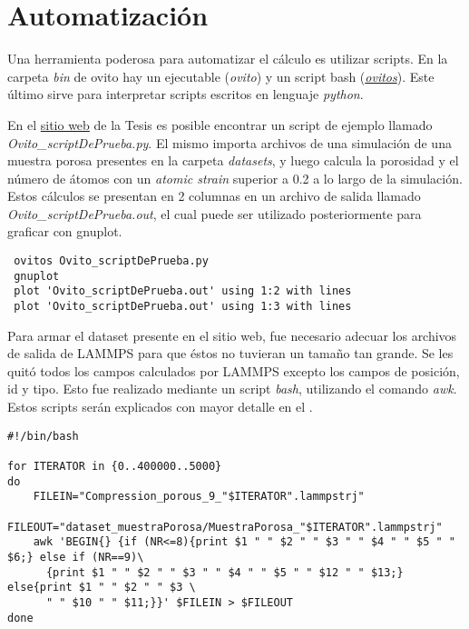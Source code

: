 \section{Automatización}
\label{AB_3}

Una herramienta poderosa para automatizar el cálculo es utilizar scripts. En la carpeta \textit{bin} de ovito hay un ejecutable (\textit{ovito}) y un script bash (\textit{\href{http://www.ovito.org/manual/python/introduction/running.html}{ovitos}}). Este último sirve para interpretar scripts escritos en lenguaje \textit{python}. 

En el \href{https://github.com/francoa/Tesis/tree/master/Resources}{sitio web} de la Tesis es posible encontrar un script de ejemplo llamado \textit{Ovito\_scriptDePrueba.py}. El mismo importa archivos de una simulación de una muestra porosa presentes en la carpeta \textit{datasets}, y luego calcula la porosidad y el número de átomos con un \textit{atomic strain} superior a 0.2 a lo largo de la simulación. Estos cálculos se presentan en 2 columnas en un archivo de salida llamado \textit{Ovito\_scriptDePrueba.out}, el cual puede ser utilizado posteriormente para graficar con gnuplot.

\begin{lstlisting}
 ovitos Ovito_scriptDePrueba.py
 gnuplot
 plot 'Ovito_scriptDePrueba.out' using 1:2 with lines
 plot 'Ovito_scriptDePrueba.out' using 1:3 with lines
\end{lstlisting}

Para armar el dataset presente en el sitio web, fue necesario adecuar los archivos de salida de LAMMPS para que éstos no tuvieran un tamaño tan grande. Se les quitó todos los campos calculados por LAMMPS excepto los campos de posición, id y tipo. Esto fue realizado mediante un script \textit{bash}, utilizando el comando \textit{awk}. Estos scripts serán explicados con mayor detalle en el .

\begin{lstlisting}
#!/bin/bash

for ITERATOR in {0..400000..5000}
do
	FILEIN="Compression_porous_9_"$ITERATOR".lammpstrj"
	FILEOUT="dataset_muestraPorosa/MuestraPorosa_"$ITERATOR".lammpstrj"
	awk 'BEGIN{} {if (NR<=8){print $1 " " $2 " " $3 " " $4 " " $5 " " $6;} else if (NR==9)\
	  {print $1 " " $2 " " $3 " " $4 " " $5 " " $12 " " $13;} else{print $1 " " $2 " " $3 \
	  " " $10 " " $11;}}' $FILEIN > $FILEOUT
done
\end{lstlisting}

